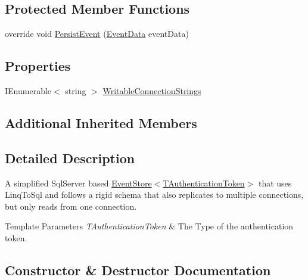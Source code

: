 \subsection*{Protected Member Functions}
\begin{DoxyCompactItemize}
\item 
override void \hyperlink{classCqrs_1_1Sql_1_1Events_1_1ReplicatedSqlEventStore_a51c9b1329327e456a251aa2d910fc7ae_a51c9b1329327e456a251aa2d910fc7ae}{Persist\+Event} (\hyperlink{classCqrs_1_1Events_1_1EventData}{Event\+Data} event\+Data)
\end{DoxyCompactItemize}
\subsection*{Properties}
\begin{DoxyCompactItemize}
\item 
I\+Enumerable$<$ string $>$ \hyperlink{classCqrs_1_1Sql_1_1Events_1_1ReplicatedSqlEventStore_af7275b09a11b2c7da447019636a5e0f9_af7275b09a11b2c7da447019636a5e0f9}{Writable\+Connection\+Strings}
\end{DoxyCompactItemize}
\subsection*{Additional Inherited Members}


\subsection{Detailed Description}
A simplified Sql\+Server based \hyperlink{classCqrs_1_1Events_1_1EventStore_a6346cb2aea4c5b4e740dc6cfb15abab8_a6346cb2aea4c5b4e740dc6cfb15abab8}{Event\+Store$<$\+T\+Authentication\+Token$>$} that uses Linq\+To\+Sql and follows a rigid schema that also replicates to multiple connections, but only reads from one connection. 


\begin{DoxyTemplParams}{Template Parameters}
{\em T\+Authentication\+Token} & The Type of the authentication token.\\
\hline
\end{DoxyTemplParams}


\subsection{Constructor \& Destructor Documentation}
\mbox{\label{classCqrs_1_1Sql_1_1Events_1_1ReplicatedSqlEventStore_aa00d17e2b147ebf7d2aff5ef1a543c07_aa00d17e2b147ebf7d2aff5ef1a543c07}} 
